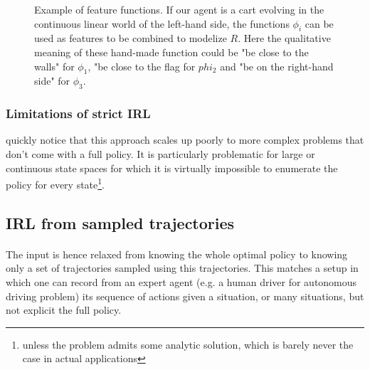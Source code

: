\documentclass{article}
\begin{document}
\begin{figure}
\begin{center}
\end{center}
\caption{Example of feature functions. If our agent is a cart evolving in the continuous linear world of the left-hand side, the functions $\phi_i$ can be used as features to be combined to modelize $R$. Here the qualitative meaning of these hand-made function could be "be close to the walls" for $\phi_1$, "be close to the flag for $phi_2$ and "be on the right-hand side" for $\phi_3$. \label{fig:features}}
\end{figure}

\subsubsection{Limitations of strict IRL}

\cite{Ng00} quickly notice that this approach scales up poorly to more complex problems that don't come with a full policy. It is particularly problematic for large or continuous state spaces for which it is virtually impossible to enumerate the policy for every state\footnote{unless the problem admits some analytic solution, which is barely never the case in actual applications}.

\subsection{IRL from sampled trajectories}

\paragraph{}
The input is hence relaxed from knowing the whole optimal policy to knowing only a set of trajectories sampled using this trajectories. This matches a setup in which one can record from an expert agent (e.g. a human driver for autonomous driving problem) its sequence of actions given a situation, or many situations, but not explicit the full policy.
\end{document}
